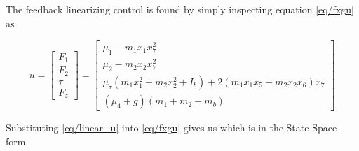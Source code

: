 \documentclass{UoNMCHA}
\numberwithin{equation}{section}
\begin{document}
	
	The feedback linearizing control is found by simply inspecting equation \eqref{eq/fxgu} as
	
	\begin{equation} \label{eq/linear_u}
	u=\left[\begin{array}{c}
	F_{1} \\
	F_{2} \\
	\tau \\
	F_{z}
	\end{array}\right]=\left[\begin{array}{c}
	\mu_{1}-m_{1} x_{1} x_{7}^{2} \\
	\mu_{2}-m_{2} x_{2} x_{7}^{2} \\
	\mu_{\tau}\left(m_{1} x_{1}^{2}+m_{2} x_{2}^{2}+I_{b}\right)+2\left(m_{1} x_{1} x_{5}+m_{2} x_{2} x_{6}\right) x_{7} \\
	\left(\mu_{4}+g\right)\left(m_{1}+m_{2}+m_{b}\right)
	\end{array}\right]
	\end{equation}

	Substituting \eqref{eq/linear_u} into \eqref{eq/fxgu} gives us which is in the State-Space form
	
\end{document}
